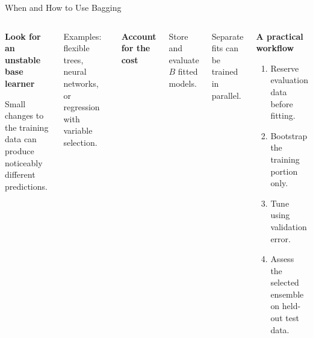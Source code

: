 \begin{frame}[t]{When and How to Use Bagging}
	\begin{columns}[T,onlytextwidth]
		\begin{definitionbox}
			\textbf{Look for an unstable base learner}\par
			Small changes to the training data can produce noticeably different predictions.
		\end{definitionbox}
		\vspace{.12cm}
		\small Examples: flexible trees, neural networks, or regression with variable selection.\par
		\vspace{.20cm}
		\textbf{Account for the cost}\par
		Store and evaluate $B$ fitted models.\par
		Separate fits can be trained in parallel.
		\begin{definitionbox}
			\textbf{A practical workflow}
			\begin{enumerate}
				\setlength{\itemsep}{.14cm}
				\item Reserve evaluation data before fitting.
				\item Bootstrap the training portion only.
				\item Tune using validation error.
				\item Assess the selected ensemble on held-out test data.
			\end{enumerate}
		\end{definitionbox}
	\end{columns}
\end{frame}


